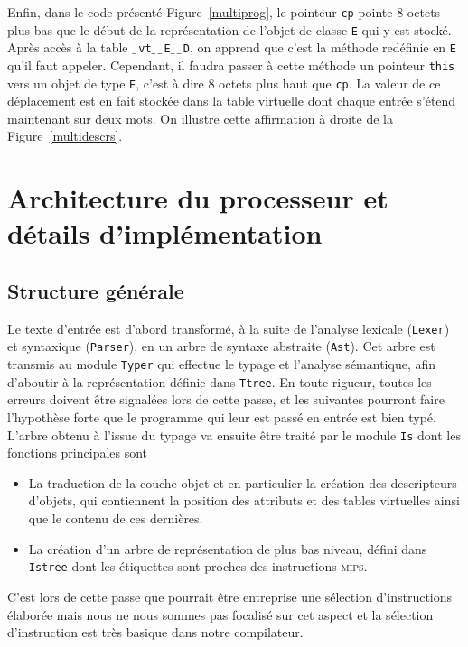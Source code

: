 \documentclass[11pt, a4paper]{article}
\newcommand{\prog}[1]{{\tt#1}}
\newcommand{\underscore}{$\_\,$}
\begin{document}
Enfin, dans le code présenté Figure~\ref{multiprog}, le pointeur \prog{cp} pointe 8 octets plus bas que le début de la représentation de l'objet de classe \prog{E} qui y est stocké. Après accès à la table \prog{\underscore{}vt\underscore{}\underscore{}E\underscore{}\underscore{}D}, on apprend que c'est la méthode redéfinie en \prog{E} qu'il faut appeler. Cependant, il faudra passer à cette méthode un pointeur \prog{this} vers un objet de type \prog{E}, c'est à dire 8 octets plus haut que \prog{cp}. La valeur de ce déplacement est en fait stockée dans la table virtuelle dont chaque entrée s'étend maintenant sur deux mots. On illustre cette affirmation à droite de la Figure~\ref{multidescrs}.

\bigskip
\bigskip

\section{Architecture du processeur et détails d'implémentation}

\subsection{Structure générale}

Le texte d'entrée est d'abord transformé, à la suite de l'analyse lexicale (\prog{Lexer}) et syntaxique (\prog{Parser}), en un arbre de syntaxe abstraite (\prog{Ast}). Cet arbre est transmis au module \prog{Typer} qui effectue le typage et l'analyse sémantique, afin d'aboutir à la représentation définie dans \prog{Ttree}. En toute rigueur, toutes les erreurs doivent être signalées lors de cette passe, et les suivantes pourront faire l'hypothèse forte que le programme qui leur est passé en entrée est bien typé. L'arbre obtenu à l'issue du typage va ensuite être traité par le module \prog{Is} dont les fonctions principales sont
\begin{itemize}
\item La traduction de la couche objet et en particulier la création des descripteurs d'objets, qui contiennent la position des attributs et des tables virtuelles ainsi que le contenu de ces dernières.
\item La création d'un arbre de représentation de plus bas niveau, défini dans \prog{Istree} dont les étiquettes sont proches des instructions \textsc{mips}.
\end{itemize}
C'est lors de cette passe que pourrait être entreprise une sélection d'instructions élaborée mais nous ne nous sommes pas focalisé sur cet aspect et la sélection d'instruction est très basique dans notre compilateur.
\end{document}
